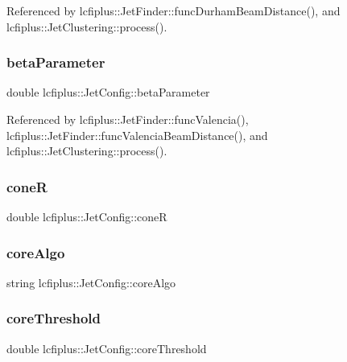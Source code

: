 Referenced by lcfiplus\+::\+Jet\+Finder\+::func\+Durham\+Beam\+Distance(), and lcfiplus\+::\+Jet\+Clustering\+::process().

\mbox{\label{structlcfiplus_1_1JetConfig_ab761c41a155b09ce94f32a1736892af5}} 
\subsubsection{beta\+Parameter}
{\footnotesize\ttfamily double lcfiplus\+::\+Jet\+Config\+::beta\+Parameter}



Referenced by lcfiplus\+::\+Jet\+Finder\+::func\+Valencia(), lcfiplus\+::\+Jet\+Finder\+::func\+Valencia\+Beam\+Distance(), and lcfiplus\+::\+Jet\+Clustering\+::process().

\mbox{\label{structlcfiplus_1_1JetConfig_a032995a25a65ff8d22ae24c03ea1f606}} 
\subsubsection{coneR}
{\footnotesize\ttfamily double lcfiplus\+::\+Jet\+Config\+::coneR}

\mbox{\label{structlcfiplus_1_1JetConfig_ab930891a6d40608cfda910e8384c75b9}} 
\subsubsection{core\+Algo}
{\footnotesize\ttfamily string lcfiplus\+::\+Jet\+Config\+::core\+Algo}

\mbox{\label{structlcfiplus_1_1JetConfig_a0c73ffb44ac40a0ff3a057bc2f01f08b}} 
\subsubsection{core\+Threshold}
{\footnotesize\ttfamily double lcfiplus\+::\+Jet\+Config\+::core\+Threshold}

